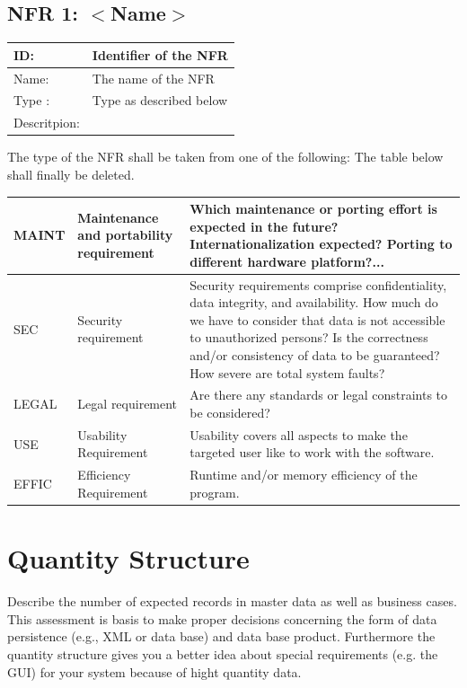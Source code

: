 \documentclass[12pt]{article}
\theoremstyle{definition}
\newenvironment{explanation}{%
   \setlength{\parindent}{0pt}
   \itshape
   \color{blue}
}{}
\begin{document}
\subsection{NFR 1: $<$Name$>$}
\begin{tabular}{|p{.2\linewidth}|p{.65\linewidth}|}
\hline 
ID: & Identifier of the NFR \\ \hline
Name: & The name of the NFR \\ \hline
Type	: & Type as described below \\ \hline
Descritpion: &  \\ \hline
\end{tabular}

The type of the NFR shall be taken from one of the following: The table below shall finally be deleted.

\begin{tabular}{|p{.15\linewidth}|p{.25\linewidth}|p{.4\linewidth}|}
\hline
MAINT & Maintenance and portability requirement & Which maintenance or porting effort is expected in the future? Internationalization expected? Porting to different hardware platform?... \\ \hline
SEC & Security requirement & Security requirements comprise confidentiality, data integrity, and availability. How much do we have to consider that data is not accessible to unauthorized persons? Is the correctness and/or consistency of data to be guaranteed? How severe are total system faults? \\ \hline
LEGAL & Legal requirement & Are there any standards or legal constraints to be considered? \\ \hline
USE & Usability Requirement & Usability covers all aspects to make the targeted user like to work with the software. \\ \hline
EFFIC & Efficiency Requirement & Runtime and/or memory efficiency of the program. \\ \hline
\end{tabular}
\pagebreak

\section{Quantity Structure}
\begin{explanation}
Describe the number of expected records in master data as well as business cases. This assessment is basis to make proper decisions concerning the form of data persistence (e.g., XML or data base) and data base product. Furthermore the quantity structure gives you a better idea about special requirements (e.g. the GUI) for your system because of hight quantity data.
\end{explanation}
\end{document}
